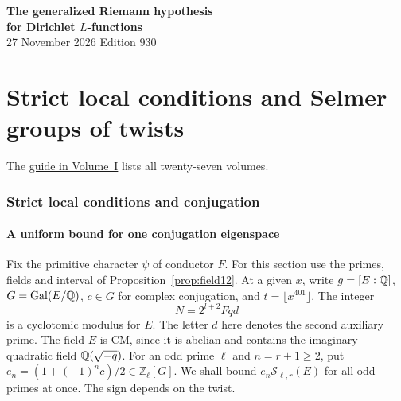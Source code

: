 \documentclass[a4paper,11pt]{article}
\theoremstyle{definition}
\theoremstyle{remark}
\newcommand{\ZZ}{\mathbb Z}\newcommand{\ord}{\operatorname{ord}}
\numberwithin{equation}{section}
\begin{document}
\setcounter{part}{1}
\thispagestyle{plain}\begin{center}
{\LARGE\bfseries The generalized Riemann hypothesis\\[2pt]for Dirichlet \(L\)-functions}\\[6pt]
{\small 27 November 2026 \quad\textperiodcentered\quad Edition 930}\end{center}
\part{Strict local conditions and Selmer groups of twists}\label{part:II}
\begin{abstract}\noindent We impose the strict local conditions on both conjugation eigenspaces. Tame inertia and auxiliary twists give tests for the Selmer groups, whose lengths are compared with critical values over a common interval.\end{abstract}
\setcounter{section}{10}
\noindent The \hyperref[seriesguide]{guide in Volume~I} lists all twenty-seven volumes.
\begingroup\small\setlength{\parskip}{0pt}\tableofcontents\endgroup
\clearpage

\section{Strict local conditions and conjugation}\label{nav:g-II-0}\label{nav:volume-II}

\subsection{A uniform bound for one conjugation eigenspace}\label{nav:II-00}
\label{sec:critical13}

Fix the primitive character \(\psi\) of conductor \(F\). For this section use the primes, fields and interval of Proposition~\ref{prop:field12}. At a given \(x\), write \(g=[E:\mathbb Q]\), \(G=\operatorname{Gal}(E/\mathbb Q)\), \(c\in G\) for complex conjugation, and \(t=\lfloor x^{401}\rfloor\). The integer
\[
                       N=2^{l+2}Fqd
\]
is a cyclotomic modulus for \(E\). The letter \(d\) here denotes the second auxiliary prime. The field \(E\) is CM, since it is abelian and contains the imaginary quadratic field \(\mathbb Q(\sqrt{-q})\). For an odd prime \(\ell\) and \(n=r+1\ge2\), put \(e_n=(1+(-1)^nc)/2\in\ZZ_\ell[G]\). We shall bound \(e_n\mathcal S_{\ell,r}(E)\) for all odd primes at once. The sign depends on the twist.
\end{document}
